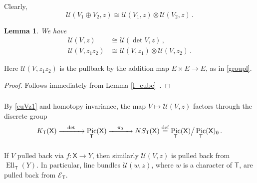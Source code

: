 \documentclass[14pt]{extarticle}
\newcommand{\Ct}{\mathbb{C}^\times}
\newcommand{\bT}{\mathsf{T}}
\newcommand{\bX}{\mathsf{X}}
\newcommand{\cU}{\mathscr{U}}
\newcommand{\cE}{\mathscr{E}}
\newcommand{\cO}{\mathscr{O}}
\DeclareMathOperator{\Ell}{Ell}
\DeclareMathOperator{\pt}{pt}
\DeclareMathOperator{\Pic}{Pic}
\newtheorem{Lemma}{Lemma}[section]
\theoremstyle{definition}
\begin{document}
\subsubsection{}

Clearly, 
$$
\cU(V_1 \oplus V_2,z) \cong \cU(V_1,z)  \otimes \cU(V_2,z)\,. 
$$

\begin{Lemma}
  We have
  \begin{align}
    \label{euVz1}
    \cU(V,z) &\cong \cU(\det V,z)\,, \\
    \cU(V,z_1z_2) &\cong \cU(V,z_1)
    \otimes \cU(V,z_2)\,. \label{euVz2}
  \end{align}
\end{Lemma}

\noindent
Here $\cU(V,z_1z_2)$ is the pullback by the addition map $E \times E \to
E$, as in \eqref{groupl}.

\begin{proof}
  Follows immediately from Lemma \ref{l_cube} \,. 
\end{proof}

\subsubsection{}

By \eqref{euVz1} and homotopy invariance, the map $V\mapsto \cU(V,z)$
factors through the discrete group
$$
K_\bT(\bX) \xrightarrow{\quad \det \quad} \Pic_{\bT}(\bX)
\xrightarrow{\quad \pi_0 \quad}
NS_\bT(\bX) \overset{\tiny\textup{def}} = \Pic_{\bT}(\bX) \big/
\Pic_{\bT}(\bX)_0 \,. 
$$

\subsubsection{}

If $V$ pulled back via $f: \bX \to Y$, then similarly $\cU(V,z)$ is
pulled back from $\Ell_\bT(Y)$. In particular, line bundles $\cU(w, z)$, where $w$ is a character of
$\bT$, are pulled back from $\cE_\bT$.
\end{document}
